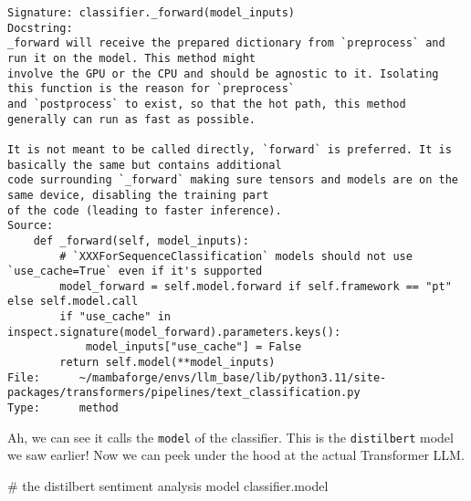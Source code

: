 \documentclass[
  letterpaper,
  DIV=11,
  numbers=noendperiod]{scrartcl}
\newenvironment{Shaded}{\begin{snugshade}}{\end{snugshade}}
\newcommand{\CommentTok}[1]{\textcolor[rgb]{0.37,0.37,0.37}{#1}}
\newcommand{\NormalTok}[1]{\textcolor[rgb]{0.00,0.23,0.31}{#1}}
\begin{document}
\begin{verbatim}
Signature: classifier._forward(model_inputs)
Docstring:
_forward will receive the prepared dictionary from `preprocess` and run it on the model. This method might
involve the GPU or the CPU and should be agnostic to it. Isolating this function is the reason for `preprocess`
and `postprocess` to exist, so that the hot path, this method generally can run as fast as possible.

It is not meant to be called directly, `forward` is preferred. It is basically the same but contains additional
code surrounding `_forward` making sure tensors and models are on the same device, disabling the training part
of the code (leading to faster inference).
Source:   
    def _forward(self, model_inputs):
        # `XXXForSequenceClassification` models should not use `use_cache=True` even if it's supported
        model_forward = self.model.forward if self.framework == "pt" else self.model.call
        if "use_cache" in inspect.signature(model_forward).parameters.keys():
            model_inputs["use_cache"] = False
        return self.model(**model_inputs)
File:      ~/mambaforge/envs/llm_base/lib/python3.11/site-packages/transformers/pipelines/text_classification.py
Type:      method
\end{verbatim}

Ah, we can see it calls the \texttt{model} of the classifier. This is
the \texttt{distilbert} model we saw earlier! Now we can peek under the
hood at the actual Transformer LLM.

\begin{Shaded}
\begin{Highlighting}[]
\CommentTok{\# the distilbert sentiment analysis model}
\NormalTok{classifier.model}
\end{Highlighting}
\end{Shaded}
\end{document}
